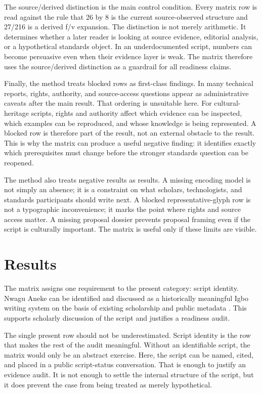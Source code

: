 \documentclass[sigconf,nonacm]{acmart}
\begin{document}
The source/derived distinction is the main control condition. Every matrix row
is read against the rule that 26 by 8 is the current source-observed structure
and 27/216 is a derived f/v expansion. The distinction is not merely arithmetic.
It determines whether a later reader is looking at source evidence, editorial
analysis, or a hypothetical standards object. In an underdocumented script,
numbers can become persuasive even when their evidence layer is weak. The
matrix therefore uses the source/derived distinction as a guardrail for all
readiness claims.

Finally, the method treats blocked rows as first-class findings. In many
technical reports, rights, authority, and source-access questions appear as
administrative caveats after the main result. That ordering is unsuitable here.
For cultural-heritage scripts, rights and authority affect which evidence can
be inspected, which examples can be reproduced, and whose knowledge is being
represented. A blocked row is therefore part of the result, not an external
obstacle to the result. This is why the matrix can produce a useful negative
finding: it identifies exactly which prerequisites must change before the
stronger standards question can be reopened.

The method also treats negative results as results. A missing encoding model is
not simply an absence; it is a constraint on what scholars, technologists, and
standards participants should write next. A blocked representative-glyph row is
not a typographic inconvenience; it marks the point where rights and source
access matter. A missing proposal dossier prevents proposal framing even if the
script is culturally important. The matrix is useful only if these limits are
visible.

\section{Results}
The matrix assigns one requirement to the present category: script identity.
Nwagu Aneke can be identified and discussed as a historically meaningful Igbo
writing system on the basis of existing scholarship and public metadata
\cite{azuonye1992,omniglotNwagu,scriptSourceNwagu}. This supports scholarly
discussion of the script and justifies a readiness audit.

The single present row should not be underestimated. Script identity is the row
that makes the rest of the audit meaningful. Without an identifiable script,
the matrix would only be an abstract exercise. Here, the script can be named,
cited, and placed in a public script-status conversation. That is enough to
justify an evidence audit. It is not enough to settle the internal structure of
the script, but it does prevent the case from being treated as merely
hypothetical.
\end{document}
